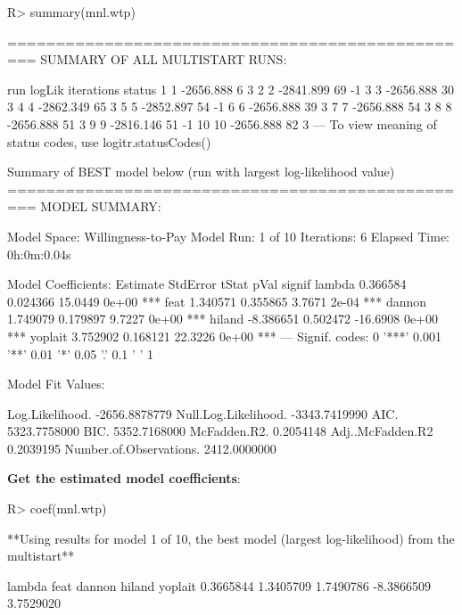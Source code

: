 \documentclass[article]{jss}
\begin{document}
\begin{CodeChunk}

\begin{CodeInput}
R> summary(mnl.wtp)
\end{CodeInput}

\begin{CodeOutput}
=================================================
SUMMARY OF ALL MULTISTART RUNS:

   run    logLik iterations status
1    1 -2656.888          6      3
2    2 -2841.899         69     -1
3    3 -2656.888         30      3
4    4 -2862.349         65      3
5    5 -2852.897         54     -1
6    6 -2656.888         39      3
7    7 -2656.888         54      3
8    8 -2656.888         51      3
9    9 -2816.146         51     -1
10  10 -2656.888         82      3
---
To view meaning of status codes, use logitr.statusCodes() 

Summary of BEST model below (run with largest log-likelihood value)
=================================================
MODEL SUMMARY: 
                                
Model Space:  Willingness-to-Pay
Model Run:               1 of 10
Iterations:                    6
Elapsed Time:        0h:0m:0.04s

Model Coefficients: 
         Estimate StdError    tStat  pVal signif
lambda   0.366584 0.024366  15.0449 0e+00    ***
feat     1.340571 0.355865   3.7671 2e-04    ***
dannon   1.749079 0.179897   9.7227 0e+00    ***
hiland  -8.386651 0.502472 -16.6908 0e+00    ***
yoplait  3.752902 0.168121  22.3226 0e+00    ***
---
Signif. codes:  0 '***' 0.001 '**' 0.01 '*' 0.05 '.' 0.1 ' ' 1

Model Fit Values: 
                                     
Log.Likelihood.         -2656.8878779
Null.Log.Likelihood.    -3343.7419990
AIC.                     5323.7758000
BIC.                     5352.7168000
McFadden.R2.                0.2054148
Adj..McFadden.R2            0.2039195
Number.of.Observations.  2412.0000000
\end{CodeOutput}
\end{CodeChunk}

\textbf{Get the estimated model coefficients}:

\begin{CodeChunk}

\begin{CodeInput}
R> coef(mnl.wtp)
\end{CodeInput}

\begin{CodeOutput}
**Using results for model 1 of 10,
the best model (largest log-likelihood) from the multistart**
\end{CodeOutput}

\begin{CodeOutput}
    lambda       feat     dannon     hiland    yoplait 
 0.3665844  1.3405709  1.7490786 -8.3866509  3.7529020 
\end{CodeOutput}
\end{CodeChunk}
\end{document}
